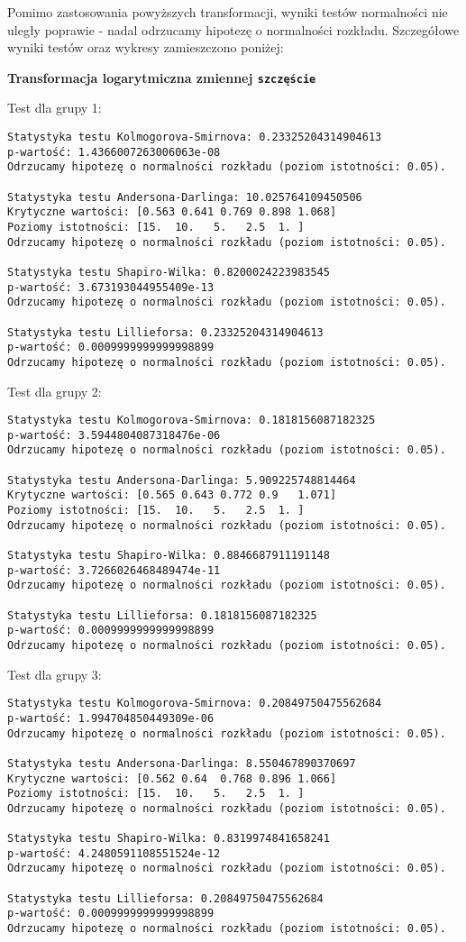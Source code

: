 \documentclass[12pt,a4paper]{article}
\begin{document}
\vspace{10mm}
Pomimo zastosowania powyższych transformacji, wyniki testów normalności nie uległy poprawie - nadal odrzucamy hipotezę o normalności rozkładu. Szczegółowe wyniki testów oraz wykresy zamieszczono poniżej:
\newpage
\begin{center}
    \textbf{Transformacja logarytmiczna zmiennej \texttt{szczęście}}
\end{center}
Test dla grupy 1:
\begin{lstlisting}
Statystyka testu Kolmogorova-Smirnova: 0.23325204314904613
p-wartość: 1.4366007263006063e-08
Odrzucamy hipotezę o normalności rozkładu (poziom istotności: 0.05).

Statystyka testu Andersona-Darlinga: 10.025764109450506
Krytyczne wartości: [0.563 0.641 0.769 0.898 1.068]
Poziomy istotności: [15.  10.   5.   2.5  1. ]
Odrzucamy hipotezę o normalności rozkładu (poziom istotności: 0.05).

Statystyka testu Shapiro-Wilka: 0.8200024223983545
p-wartość: 3.673193044955409e-13
Odrzucamy hipotezę o normalności rozkładu (poziom istotności: 0.05).

Statystyka testu Lillieforsa: 0.23325204314904613
p-wartość: 0.0009999999999998899
Odrzucamy hipotezę o normalności rozkładu (poziom istotności: 0.05).
\end{lstlisting}
Test dla grupy 2:
\begin{lstlisting}
Statystyka testu Kolmogorova-Smirnova: 0.1818156087182325
p-wartość: 3.5944804087318476e-06
Odrzucamy hipotezę o normalności rozkładu (poziom istotności: 0.05).

Statystyka testu Andersona-Darlinga: 5.909225748814464
Krytyczne wartości: [0.565 0.643 0.772 0.9   1.071]
Poziomy istotności: [15.  10.   5.   2.5  1. ]
Odrzucamy hipotezę o normalności rozkładu (poziom istotności: 0.05).

Statystyka testu Shapiro-Wilka: 0.8846687911191148
p-wartość: 3.7266026468489474e-11
Odrzucamy hipotezę o normalności rozkładu (poziom istotności: 0.05).

Statystyka testu Lillieforsa: 0.1818156087182325
p-wartość: 0.0009999999999998899
Odrzucamy hipotezę o normalności rozkładu (poziom istotności: 0.05).
\end{lstlisting}
Test dla grupy 3:
\begin{lstlisting}
Statystyka testu Kolmogorova-Smirnova: 0.20849750475562684
p-wartość: 1.994704850449309e-06
Odrzucamy hipotezę o normalności rozkładu (poziom istotności: 0.05).

Statystyka testu Andersona-Darlinga: 8.550467890370697
Krytyczne wartości: [0.562 0.64  0.768 0.896 1.066]
Poziomy istotności: [15.  10.   5.   2.5  1. ]
Odrzucamy hipotezę o normalności rozkładu (poziom istotności: 0.05).

Statystyka testu Shapiro-Wilka: 0.8319974841658241
p-wartość: 4.2480591108551524e-12
Odrzucamy hipotezę o normalności rozkładu (poziom istotności: 0.05).

Statystyka testu Lillieforsa: 0.20849750475562684
p-wartość: 0.0009999999999998899
Odrzucamy hipotezę o normalności rozkładu (poziom istotności: 0.05).
\end{lstlisting}
\end{document}
